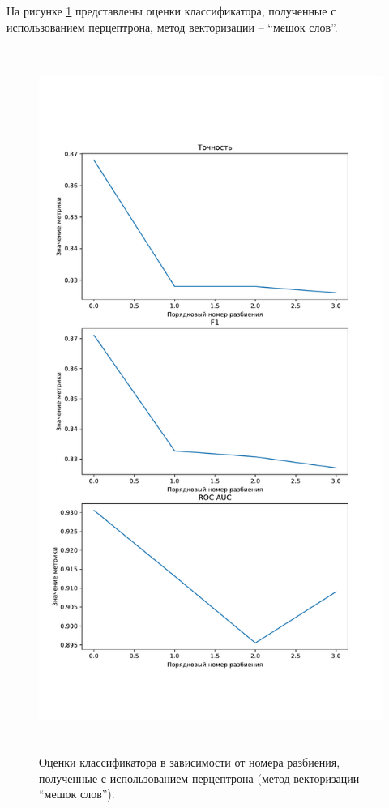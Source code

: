 На рисунке \ref{img:perceptronMetricsBag} представлены оценки классификатора, полученные с использованием перцептрона, метод векторизации -- ``мешок слов''.
\begin{figure}[H]
	\centering
	\includegraphics[height=23cm]{inc/plots/perceptronMetricsBag.pdf}
	\caption{ Оценки классификатора в зависимости от номера разбиения, полученные с использованием перцептрона (метод векторизации --  ``мешок слов''). }
	\label{img:perceptronMetricsBag}
\end{figure}


